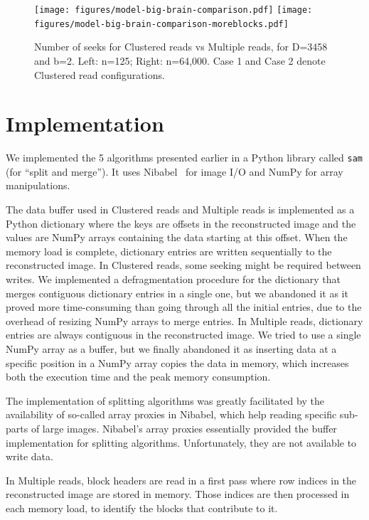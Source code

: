 \documentclass[10pt, conference, compsocconf]{IEEEtran}
\newcommand{\todo}[1]{\marginpar{\parbox{18mm}{\flushleft\tiny\color{red}\textbf{TODO}:
      #1}}}
\begin{document}
\begin{figure}
  \texttt{[image: figures/model-big-brain-comparison.pdf]}
  \texttt{[image: figures/model-big-brain-comparison-moreblocks.pdf]}
  \caption{Number of seeks for Clustered reads vs Multiple reads, for
    D=3458 and b=2. Left: n=125; Right: n=64,000. Case 1 and Case 2
    denote Clustered read configurations.}
  \label{fig:model-comparison}
\end{figure}

\section{Implementation}
\label{sec:implementation}

\todo{writing in this section could be improved.}
We implemented the 5 algorithms presented earlier in a
Python library called \texttt{sam} (for ``split and merge''). It uses
Nibabel~\cite{matthew_brett_2016_60808} for image I/O and NumPy for
array manipulations.

The data buffer used in Clustered reads and Multiple reads is
implemented as a Python dictionary where the keys are offsets in the
reconstructed image and the values are NumPy arrays containing the
data starting at this offset. When the memory load is complete,
dictionary entries are written sequentially to the reconstructed
image. In Clustered reads, some seeking might be required between
writes. We implemented a defragmentation procedure for the dictionary
that merges contiguous dictionary entries in a single one, but we
abandoned it as it proved more time-consuming than going through all
the initial entries, due to the overhead of resizing NumPy arrays to
merge entries. In Multiple reads, dictionary entries are always
contiguous in the reconstructed image.  We tried to use a single NumPy
array as a buffer, but we finally abandoned it as inserting data at a
specific position in a NumPy array copies the data in memory, which
increases both the execution time and the peak memory consumption.

The implementation of splitting algorithms was greatly facilitated by
the availability of so-called array proxies in Nibabel, which help
reading specific sub-parts of large images. Nibabel's array proxies
essentially provided the buffer implementation for splitting
algorithms. Unfortunately, they are not available to write
data. 

In Multiple reads, block headers are read in a first pass where row
indices in the reconstructed image are stored in memory. Those indices
are then processed in each memory load, to identify the blocks that
contribute to it.
\end{document}
